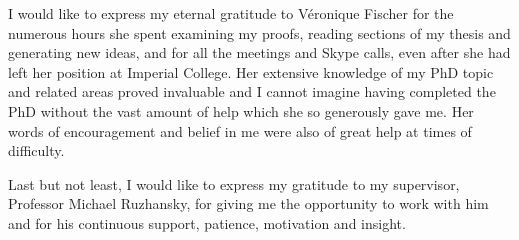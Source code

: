I would like to express my eternal gratitude to V\'eronique Fischer for the numerous hours she spent examining my proofs,
reading sections of my thesis and generating new ideas,
and for all the meetings and Skype calls,
even after she had left her position at Imperial College.
Her extensive knowledge of my PhD topic and related areas proved invaluable and
I cannot imagine having completed the PhD without the vast amount of help which she so generously gave me.
Her words of encouragement and belief in me were also of great help at times of difficulty.

Last but not least,
I would like to express my gratitude to my supervisor,
Professor Michael Ruzhansky,
for giving me the opportunity to work with him and for his continuous support, patience, motivation and insight.
